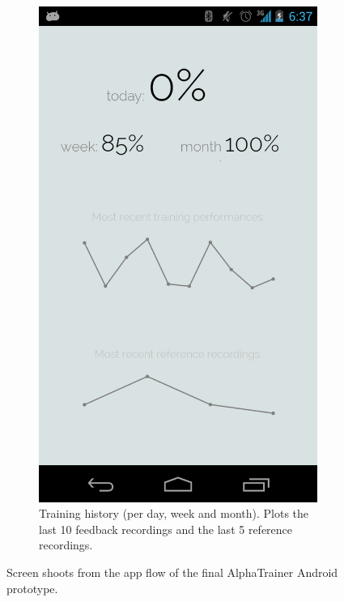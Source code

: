 \documentclass[a4paper,10pt,english,lof,lot,twoside]{puthesis}
\begin{document}
\begin{figure}
\begin{subfigure}[t]{0.30\linewidth}
\includegraphics[width=0.800\linewidth]{final-prototype-history-overview.png}
\caption[Training history]{Training history (per day, week and month). Plots the last 10 feedback
recordings and the last 5 reference recordings.}\label{ch-design/index:fig-final-prototype-app-flow-training-history}\end{subfigure}
\caption[Screen shoots from the app flow of the final AlphaTrainer Android prototype]{Screen shoots from the app flow of the final AlphaTrainer Android
prototype.}\label{ch-design/index:fig-final-prototype-app-flow}

\end{figure}
\end{document}
